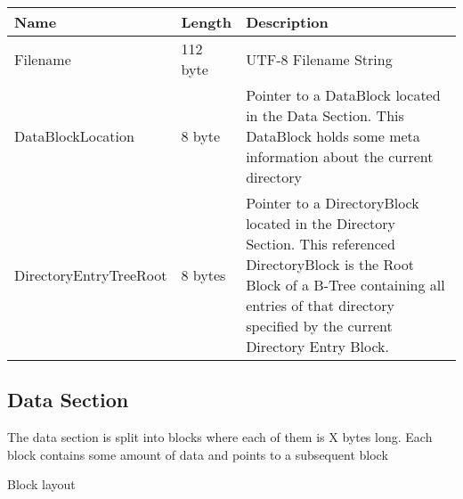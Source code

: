 \begin{tabular}{|l|l|p{5cm}|}
\hline
  \textbf{Name} & \textbf{Length} & \textbf{Description}
\\  \hline

Filename & 112 byte & UTF-8 Filename String 


\\  \hline

DataBlockLocation & 8 byte & Pointer to a DataBlock located in the Data Section. This DataBlock holds some meta information about the current directory


\\  \hline

DirectoryEntryTreeRoot & 8 bytes & Pointer to a DirectoryBlock located in the Directory Section. This referenced DirectoryBlock is the Root Block of a B-Tree containing all entries of that directory specified by the current Directory Entry Block.



\\  \hline

\end{tabular}


\subsection{Data Section}
The data section is split into blocks where each of them is X bytes long. Each block contains some amount of data and points to a subsequent block


Block layout \\


